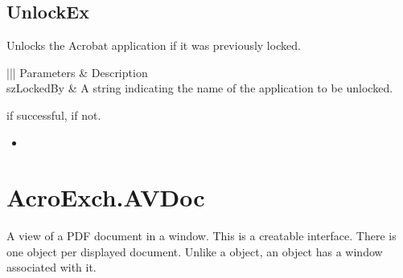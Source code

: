 \documentclass[letterpaper,12pt,english,openany,oneside]{sphinxmanual}
\begin{document}
\subsection{UnlockEx}
\label{\detokenize{IAC_API_OLE_Objects:unlockex}}
Unlocks the Acrobat application if it was previously locked.


\begin{sphinxVerbatim}[commandchars=\\\{\}]
   
\end{sphinxVerbatim}
\label{\detokenize{IAC_API_OLE_Objects:parameters-18}}


\begin{savenotes}\sphinxattablestart
\centering
{}\label{\detokenize{IAC_API_OLE_Objects:section-20}}\nobreak
\begin{tabular}[t]{|||}
\hline
\sphinxstyletheadfamily 
Parameters
&\sphinxstyletheadfamily 
Description
\\
\hline
szLockedBy
&
A string indicating the name of the application to be unlocked.
\\
\hline
\end{tabular}
\par
\sphinxattableend\end{savenotes}


 if successful,  if not.

\label{\detokenize{IAC_API_OLE_Objects:related-methods-27}}
\begin{itemize}
\item {} 
 

\end{itemize}




\section{AcroExch.AVDoc}
\label{\detokenize{IAC_API_OLE_Objects:acroexch-avdoc}}
A view of a PDF document in a window. This is a creatable interface. There is one  object per displayed document. Unlike a  object, an  object has a window associated with it.
\end{document}
